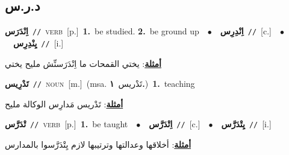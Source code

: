 \documentclass[10pt,a4paper,twoside]{article} %
\begin{document}
\begin{multicols}{2}
\vspace{-3mm}
\subsection*{\color{blue}\foreignlanguage{arabic}{د.ر.س}\color{blue}{}} 

{\setlength\topsep{0pt}\textbf{\foreignlanguage{arabic}{اِنْدَرَس}}\ {\color{gray}\texttt{//}\color{black}}\ \textsc{verb}\ [p.]\ \textbf{1.}~be studied.  \textbf{2.}~be ground up\ \ $\bullet$\ \ \setlength\topsep{0pt}\textbf{\foreignlanguage{arabic}{اِنْدِرِس}}\ {\color{gray}\texttt{//}\color{black}}\ [c.]\ \ $\bullet$\ \ \setlength\topsep{0pt}\textbf{\foreignlanguage{arabic}{يِنْدِرِس}}\ {\color{gray}\texttt{//}\color{black}}\ [i.]\  \begin{flushright}\color{gray}\foreignlanguage{arabic}{\textbf{\underline{\foreignlanguage{arabic}{أمثلة}}}: يختي القمحات ما اِنْدَرَسنِّش مليح يختي}\end{flushright}\color{black}} \vspace{2mm}

{\setlength\topsep{0pt}\textbf{\foreignlanguage{arabic}{تَدْرِيس}}\ {\color{gray}\texttt{//}\color{black}}\ \textsc{noun}\ [m.]\ \color{gray}(msa. \foreignlanguage{arabic}{تَدْريس}~\foreignlanguage{arabic}{\textbf{١.}})\color{black}\ \textbf{1.}~teaching\  \begin{flushright}\color{gray}\foreignlanguage{arabic}{\textbf{\underline{\foreignlanguage{arabic}{أمثلة}}}: تَدْريس مَدارِس الوكالة مليح}\end{flushright}\color{black}} \vspace{2mm}

{\setlength\topsep{0pt}\textbf{\foreignlanguage{arabic}{تْدَرَّس}}\ {\color{gray}\texttt{//}\color{black}}\ \textsc{verb}\ [p.]\ \textbf{1.}~be taught\ \ $\bullet$\ \ \setlength\topsep{0pt}\textbf{\foreignlanguage{arabic}{اِتْدَرَّس}}\ {\color{gray}\texttt{//}\color{black}}\ [c.]\ \ $\bullet$\ \ \setlength\topsep{0pt}\textbf{\foreignlanguage{arabic}{يِتْدَرَّس}}\ {\color{gray}\texttt{//}\color{black}}\ [i.]\  \begin{flushright}\color{gray}\foreignlanguage{arabic}{\textbf{\underline{\foreignlanguage{arabic}{أمثلة}}}: أخلاقها وعدالتها وترتيبها لازم يِتْدَرَّسوا بالمدارس}\end{flushright}\color{black}} \vspace{2mm}


\end{multicols}
\end{document}
